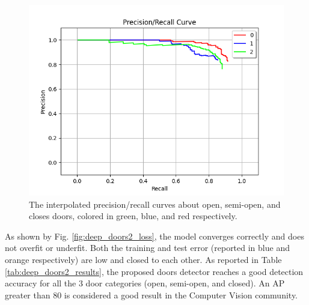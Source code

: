 \begin{figure}[h!]
	\centering
	\includegraphics[width=\linewidth]{images/deep_doors_2_precision_recall.png}
	\caption{The interpolated precision/recall curves about open, semi-open, and closes doors, colored in green, blue, and red respectively.}
	\label{fig:deep_doors2_ap_plot}
\end{figure} 

As shown by Fig. \ref{fig:deep_doors2_loss}, the model converges correctly and does not overfit or underfit. Both the training and test error (reported in blue and orange respectively) are low and closed to each other. As reported in Table \ref{tab:deep_doors2_results}, the proposed doors detector reaches a good detection accuracy for all the 3 door categories (open, semi-open, and closed). An AP greater than 80 is considered a good result in the Computer Vision community.

